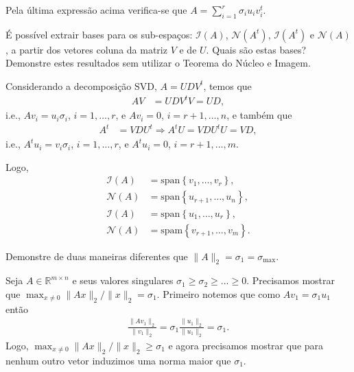 \begin{questions}
\begin{solution}
        Pela \'{u}ltima express\~{a}o acima verifica-se que $A = \sum_{i = 1}^r \sigma_i u_i v_i^t$.
    \end{solution}

     \'{E} poss\'{i}vel extrair bases para os sub-espa\c{c}os: $\mathcal{I}(A)$, $\mathcal{N}(A^t)$, $\mathcal{I}(A^t)$ e $\mathcal{N}(A)$, a partir dos vetores coluna da matriz $V$ e de $U$. Quais s\~{a}o estas bases? Demonstre estes resultados sem utilizar o Teorema do N\'{u}cleo e Imagem.
    \begin{solution}
        Considerando a decomposi\c{c}\~{a}o SVD, $A = U D V^t$, temos que
        \begin{align*}
            A V &= U D V^t V = U D,
        \end{align*}
        i.e., $A v_i = u_i \sigma_i$, $i = 1, \ldots, r$, e $A v_i = 0$, $i = r + 1, \ldots, n$, e tamb\'{e}m que
        \begin{align*}
            A^t &= V D U^t \Rightarrow A^t U = V D U^t U = V D,
        \end{align*}
        i.e., $A^t u_i = v_i \sigma_i$, $i = 1, \ldots, r$, e $A^t u_i = 0$, $i = r + 1, \ldots, m$.

        Logo,
        \begin{align*}
            \mathcal{I}(A) &= \mathrm{span}\left\{ v_1, \ldots, v_r \right\}, \\
            \mathcal{N}(A) &= \mathrm{span}\left\{ u_{r+1}, \ldots, u_n \right\}, \\
            \mathcal{I}(A) &= \mathrm{span}\left\{ u_1, \ldots, u_r \right\}, \\
            \mathcal{N}(A) &= \mathrm{spam}\left\{ v_{r+1}, \ldots, v_m \right\}.
        \end{align*}
    \end{solution}

     Demonstre de duas maneiras diferentes que $\| A \|_2 = \sigma_1 = \sigma_{\max}$.
    \begin{solution}
        Seja $A \in \mathbb{R}^{m \times n}$ e seus valores singulares $\sigma_1 \geq \sigma_2 \geq \ldots \geq 0$. Precisamos mostrar que $\max_{x \neq 0} \| A x \|_2 / \| x \|_2 = \sigma_1$. Primeiro notemos que como $A v_1 = \sigma_1 u_1$ ent\~{a}o
        \begin{align*}
            \frac{\| A v_1 \|_2}{\| v_1 \|_2} = \sigma_1 \frac{\| u_1 \|_2}{\| u_1 \|_2} = \sigma_1.
        \end{align*}
        Logo, $\max_{x \neq 0} \| A x \|_2 / \| x \|_2 \geq \sigma_1$ e agora precisamos mostrar que para nenhum outro vetor induzimos uma norma maior que $\sigma_1$.


\end{solution}
\end{questions}
